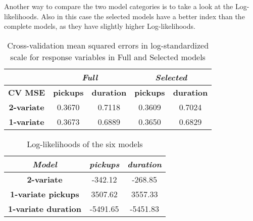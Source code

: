 Another way to compare the two model categories is to take a look at the Log-likelihoods. Also in this case the selected models have a better index than the complete models, as they have slightly higher Log-likelihoods.
\begin{table}[h!]
	\centering
	\begin{tabular}{c|cc|cc}
		\hline
		\multicolumn{1}{l|}{} & \multicolumn{2}{c|}{\textit{Full}} & \multicolumn{2}{c}{\textit{Selected} }\\ 
		\hline
		\textbf{CV MSE} & \multicolumn{1}{c|}{\textbf{pickups }} & \textbf{duration} & \multicolumn{1}{c|}{\textbf{pickups}} & \textbf{duration} \\ 
		\hline
		\textbf{2-variate } & \multicolumn{1}{c|}{0.3670}  & 0.7118   & \multicolumn{1}{c|}{0.3609}  & 0.7024   \\ 
		\hline
		\textbf{1-variate } & \multicolumn{1}{c|}{0.3673}  & 0.6889   & \multicolumn{1}{c|}{0.3650}  & 0.6829   \\ 
		\hline
	\end{tabular}
	\caption{Cross-validation mean squared errors in log-standardized scale for response variables in Full and Selected models}
	\label{Cross-validation mean squared errors HDGM}
\end{table}
\begin{table}[h!]
	\centering
	\begin{tabular}{c|c|c}
		\hline
		\textit{Model} &\textit{pickups } & \textit{duration} \\ 
		\hline
		\textbf{2-variate } & -342.12  & -268.85    \\ 
		\hline
		\textbf{1-variate pickups } & 3507.62  & 3557.33    \\ 
		\hline
		\textbf{1-variate duration} & -5491.65  & -5451.83   \\ 
		\hline
	\end{tabular}
	\caption{Log-likelihoods of the six models}
	\label{Log-likelihoods HDGM}
\end{table}